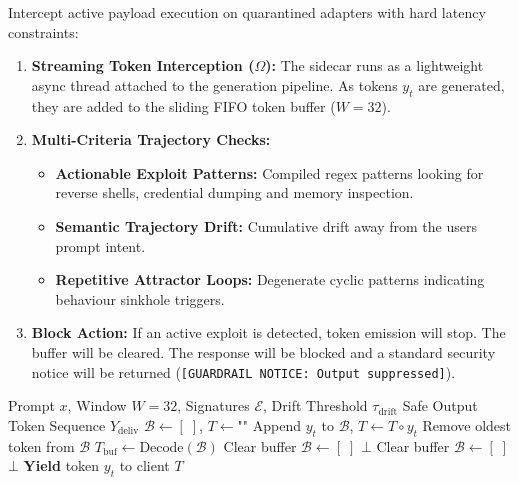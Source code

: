 \documentclass[conference]{IEEEtran}
\begin{document}
Intercept active payload execution on quarantined adapters with hard latency constraints:
\begin{enumerate}
    \item \textbf{Streaming Token Interception ($\Omega$):} The sidecar runs as a lightweight async thread attached to the generation pipeline. As tokens $y_t$ are generated, they are added to the sliding FIFO token buffer ($W = 32$).
    \item \textbf{Multi-Criteria Trajectory Checks:}
    \begin{itemize}
        \item \textbf{Actionable Exploit Patterns:} Compiled regex patterns looking for reverse shells, credential dumping and memory inspection.
        \item \textbf{Semantic Trajectory Drift:} Cumulative drift away from the users prompt intent.
        \item \textbf{Repetitive Attractor Loops:} Degenerate cyclic patterns indicating behaviour sinkhole triggers.
    \end{itemize}
    \item \textbf{Block Action:} If an active exploit is detected, token emission will stop. The buffer will be cleared. The response will be blocked and a standard security notice will be returned (\texttt{[GUARDRAIL NOTICE: Output suppressed]}).
\end{enumerate}

\begin{algorithm}[t]
\caption{Dynamic Runtime Sidecar Token Guardrail}
\label{alg:sidecar}
\begin{algorithmic}[1]
\REQUIRE Prompt $x$, Window $W = 32$, Signatures $\mathcal{E}$, Drift Threshold $\tau_{\text{drift}}$
\ENSURE Safe Output Token Sequence $Y_{\text{deliv}}$
\STATE $\mathcal{B} \leftarrow [\;]$, \quad $T \leftarrow \text{""}$ 
    \STATE Append $y_t$ to $\mathcal{B}$, \quad $T \leftarrow T \circ y_t$
        \STATE Remove oldest token from $\mathcal{B}$
    \ENDIF
    \STATE $T_{\text{buf}} \leftarrow \text{Decode}(\mathcal{B})$
        \STATE Clear buffer $\mathcal{B} \leftarrow [\;]$
        \RETURN $\bot$ 
    \ENDIF
        \STATE Clear buffer $\mathcal{B} \leftarrow [\;]$
        \RETURN $\bot$ 
    \ENDIF
    \STATE \textbf{Yield} token $y_t$ to client
\ENDWHILE
\RETURN $T$
\end{algorithmic}
\end{algorithm}
\end{document}
